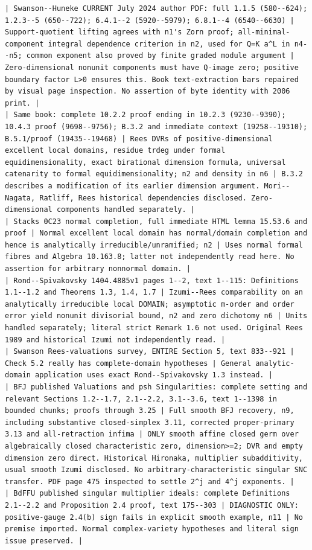 \documentclass[11pt]{article}
\begin{document}
\begin{Verbatim}[breaklines=true,fontsize=\footnotesize]
| Swanson--Huneke CURRENT July 2024 author PDF: full 1.1.5 (580--624); 1.2.3--5 (650--722); 6.4.1--2 (5920--5979); 6.8.1--4 (6540--6630) | Support-quotient lifting agrees with n1's Zorn proof; all-minimal-component integral dependence criterion in n2, used for Q=K a^L in n4--n5; common exponent also proved by finite graded module argument | Zero-dimensional nonunit components must have Q-image zero; positive boundary factor L>0 ensures this. Book text-extraction bars repaired by visual page inspection. No assertion of byte identity with 2006 print. |
| Same book: complete 10.2.2 proof ending in 10.2.3 (9230--9390); 10.4.3 proof (9698--9756); B.3.2 and immediate context (19258--19310); B.5.1/proof (19435--19468) | Rees DVRs of positive-dimensional excellent local domains, residue trdeg under formal equidimensionality, exact birational dimension formula, universal catenarity to formal equidimensionality; n2 and density in n6 | B.3.2 describes a modification of its earlier dimension argument. Mori--Nagata, Ratliff, Rees historical dependencies disclosed. Zero-dimensional components handled separately. |
| Stacks 0C23 normal completion, full immediate HTML lemma 15.53.6 and proof | Normal excellent local domain has normal/domain completion and hence is analytically irreducible/unramified; n2 | Uses normal formal fibres and Algebra 10.163.8; latter not independently read here. No assertion for arbitrary nonnormal domain. |
| Rond--Spivakovsky 1404.4885v1 pages 1--2, text 1--115: Definitions 1.1--1.2 and Theorems 1.3, 1.4, 1.7 | Izumi--Rees comparability on an analytically irreducible local DOMAIN; asymptotic m-order and order error yield nonunit divisorial bound, n2 and zero dichotomy n6 | Units handled separately; literal strict Remark 1.6 not used. Original Rees 1989 and historical Izumi not independently read. |
| Swanson Rees-valuations survey, ENTIRE Section 5, text 833--921 | Check 5.2 really has complete-domain hypotheses | General analytic-domain application uses exact Rond--Spivakovsky 1.3 instead. |
| BFJ published Valuations and psh Singularities: complete setting and relevant Sections 1.2--1.7, 2.1--2.2, 3.1--3.6, text 1--1398 in bounded chunks; proofs through 3.25 | Full smooth BFJ recovery, n9, including substantive closed-simplex 3.11, corrected proper-primary 3.13 and all-retraction infima | ONLY smooth affine closed germ over algebraically closed characteristic zero, dimension>=2; DVR and empty dimension zero direct. Historical Hironaka, multiplier subadditivity, usual smooth Izumi disclosed. No arbitrary-characteristic singular SNC transfer. PDF page 475 inspected to settle 2^j and 4^j exponents. |
| BdFFU published singular multiplier ideals: complete Definitions 2.1--2.2 and Proposition 2.4 proof, text 175--303 | DIAGNOSTIC ONLY: positive-gauge 2.4(b) sign fails in explicit smooth example, n11 | No premise imported. Normal complex-variety hypotheses and literal sign issue preserved. |


\end{Verbatim}
\end{document}
